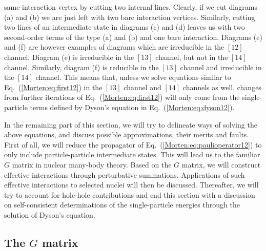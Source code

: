 same interaction vertex by cutting two internal lines.  Clearly, if we
cut diagrams (a) and (b) we are just left with two bare interaction
vertices. Similarly, cutting two lines of an intermediate state in
diagrams (c) and (d) leaves us with two second-order terms of the type
(a) and (b) and one bare interaction.  Diagrams (e) and (f) are
however examples of diagrams which are irreducible in the $[12]$
channel. Diagram (e) is irreducible in the $[13]$ channel, but not in
the $[14]$ channel.  Similarly, diagram (f) is reducible in the $[13]$
channel and irreducible in the $[14]$ channel.  This means that,
unless we solve equations similar to Eq.~(\ref{Morten:eq:first12}) in
the $[13]$ channel and $[14]$ channels as well, changes from further
iterations of Eq.~(\ref{Morten:eq:first12}) will only come from the
single-particle terms defined by Dyson's equation in
Eq.~(\ref{Morten:eq:dyson12}). 

In the remaining part of this section, we will try to delineate ways 
of solving the above equations, and discuss possible approximations,
their merits and faults. First of all, we will reduce
the propagator of  Eq.~(\ref{Morten:eq:paulioperator12}) to only include
particle-particle intermediate states. This will lead us to the familiar
$G$ matrix in nuclear many-body theory. 
Based on the $G$ matrix, we will construct effective interactions
through perturbative summations. Applications of such 
effective interactions to selected nuclei will then be discussed.
Thereafter, we will try to
account for hole-hole contributions and end this section with a 
discussion on self-consistent determinations of the single-particle 
energies through the solution of Dyson's equation.
 


\subsection{The $G$ matrix}

